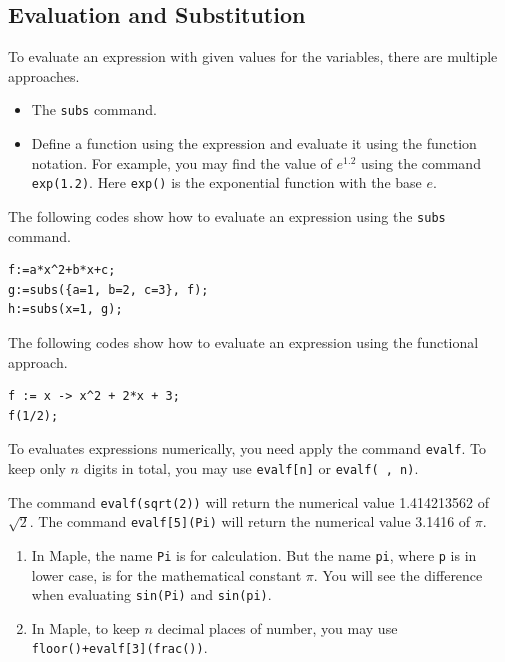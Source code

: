 \documentclass[
  12pt]{elegantbook}
\begin{document}
\hypertarget{evaluation-and-substitution}{%
\subsection{Evaluation and Substitution}\label{evaluation-and-substitution}}

To evaluate an expression with given values for the variables, there are multiple approaches.

\begin{itemize}
\item
  The \texttt{subs} command.
\item
  Define a function using the expression and evaluate it using the function notation. For example, you may find the value of \(e^{1.2}\) using the command \texttt{exp(1.2)}. Here \texttt{exp()} is the exponential function with the base \(e\).
\end{itemize}

\begin{example}

The following codes show how to evaluate an expression using the \texttt{subs} command.

\begin{verbatim}
f:=a*x^2+b*x+c;
g:=subs({a=1, b=2, c=3}, f);
h:=subs(x=1, g);
\end{verbatim}

\end{example}

\begin{example}

The following codes show how to evaluate an expression using the functional approach.

\begin{verbatim}
f := x -> x^2 + 2*x + 3;
f(1/2);
\end{verbatim}

\end{example}

To evaluates expressions numerically, you need apply the command \texttt{evalf}. To keep only \(n\) digits in total, you may use \texttt{evalf{[}n{]}} or \texttt{evalf(\ ,\ n)}.

\begin{example}
The command \texttt{evalf(sqrt(2))} will return the numerical value 1.414213562 of \(\sqrt{2}\).
The command \texttt{evalf{[}5{]}(Pi)} will return the numerical value 3.1416 of \(\pi\).
\end{example}

\begin{enumerate}
\def\labelenumi{\arabic{enumi}.}
\item
  In Maple, the name \texttt{Pi} is for calculation. But the name \texttt{pi}, where \texttt{p} is in lower case, is for the mathematical constant \(\pi\). You will see the difference when evaluating \texttt{sin(Pi)} and \texttt{sin(pi)}.
\item
  In Maple, to keep \(n\) decimal places of number, you may use \texttt{floor()+evalf{[}3{]}(frac())}.
\end{enumerate}
\end{document}
